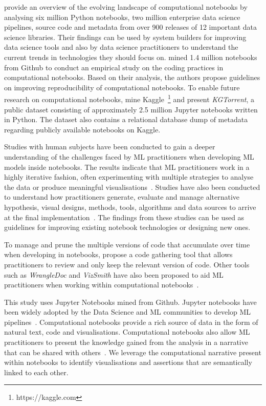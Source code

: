 \documentclass[conference]{IEEEtran}
\begin{document}
\cite{psallidas2019data} provide an overview of the evolving landscape of computational notebooks by analysing six million Python notebooks, two million enterprise data science pipelines, source code and metadata from over 900 releases of 12 important data science libraries. Their findings can be used by system builders for improving data science tools and also by data science practitioners to understand the current trends in technologies they should focus on. \cite{pimentel2019large} mined 1.4 million notebooks from Github to conduct an empirical study on the coding practices in computational notebooks. Based on their analysis, the authors propose guidelines on improving reproducibility of computational notebooks. To enable future research on computational notebooks, \cite{quaranta2021kgtorrent} mine Kaggle~\footnote{https://kaggle.com} and present \textit{KGTorrent}, a public dataset consisting of approximately 2.5 million Jupyter notebooks written in Python. The dataset also contains a relational database dump of metadata regarding publicly available notebooks on Kaggle.

Studies with human subjects have been conducted to gain a deeper understanding of the challenges faced by ML practitioners when developing ML models inside notebooks. The results indicate that ML practitioners work in a highly iterative fashion, often experimenting with multiple strategies to analyse the data or produce meaningful visualisations~\cite{kandel2012enterprise, kery2018story, liu2019understanding, chattopadhyay2020wrong}. Studies have also been conducted to understand how practitioners generate, evaluate and manage alternative hypothesis, visual designs, methods, tools, algorithms and data sources to arrive at the final implementation~\cite{liu2019understanding,kandel2012enterprise}. The findings from these studies can be used as guidelines for improving existing notebook technologies or designing new ones.

To manage and prune the multiple versions of code that accumulate over time when developing in notebooks, \cite{head2019managing} propose a code gathering tool that allows practitioners to review and only keep the relevant version of code. Other tools such as \textit{WrangleDoc} and \textit{VizSmith} have also been proposed to aid ML practitioners when working within computational notebooks~\cite{yang2021subtle, bavishi2021vizsmith}.

This study uses Jupyter Notebooks mined from Github. Jupyter notebooks have been widely adopted by the Data Science and ML communities to develop ML pipelines~\cite{wang2020assessing,pimentel2019large,quaranta2021kgtorrent}. Computational notebooks provide a rich source of data in the form of natural text, code and visualisations. Computational notebooks also allow ML practitioners to present the knowledge gained from the analysis in a narrative that can be shared with others~\cite{rule2018exploration}. We leverage the computational narrative present within notebooks to identify visualisations and assertions that are semantically linked to each other.
\end{document}
